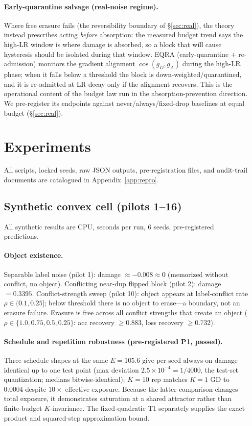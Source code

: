 \documentclass{article}
\newcommand{\Expo}{E}         %
\begin{document}
\paragraph{Early-quarantine salvage (real-noise regime).} Where free erasure fails (the
reversibility boundary of \S\ref{sec:real}), the theory instead prescribes acting \emph{before}
absorption: the measured budget trend says the high-LR window is where damage is absorbed, so a block that will cause
hysteresis should be isolated during that window. EQRA (early-quarantine $+$ re-admission)
monitors the gradient alignment $\cos(g_D,g_A)$ during the high-LR phase; when it falls below a
threshold the block is down-weighted/quarantined, and it is re-admitted at LR decay only if the
alignment recovers. This is the operational content of the budget law run in the
absorption-prevention direction. We pre-register its endpoints against never/always/fixed-drop
baselines at equal budget (\S\ref{sec:real}).

\section{Experiments}
\label{sec:exp}
All scripts, locked seeds, raw JSON outputs, pre-registration files, and audit-trail documents
are catalogued in Appendix~\ref{app:repro}.

\subsection{Synthetic convex cell (pilots 1--16)}
All synthetic results are CPU, seconds per run, 6 seeds, pre-registered predictions.

\paragraph{Object existence.} Separable label noise (pilot 1): damage $\approx-0.008\approx0$
(memorized without conflict, no object). Conflicting near-dup flipped block (pilot 2): damage
$=0.3395$. Conflict-strength sweep (pilot 10): object appears at label-conflict rate
$\rho\in(0.1,0.25]$; below threshold there is no object to erase---a boundary, not an erasure
failure. Erasure is free across all conflict strengths that create an object
($\rho\in\{1.0,0.75,0.5,0.25\}$: acc recovery $\ge0.883$, loss recovery $\ge0.732$).

\paragraph{Schedule and repetition robustness (pre-registered P1, passed).} Three schedule shapes at the same
$\Expo=105.6$ give per-seed always-on damage identical up to one test point (max deviation
$2.5\times10^{-4}=1/4000$, the test-set quantization; medians bitwise-identical);
$K{=}10$ rep matches $K{=}1$ GD to $0.0004$ despite $10\times$ effective exposure.
Because the latter comparison changes total exposure, it demonstrates saturation at a shared
attractor rather than finite-budget $K$-invariance. The fixed-quadratic T1 separately supplies
the exact product and squared-step approximation bound.
\end{document}
